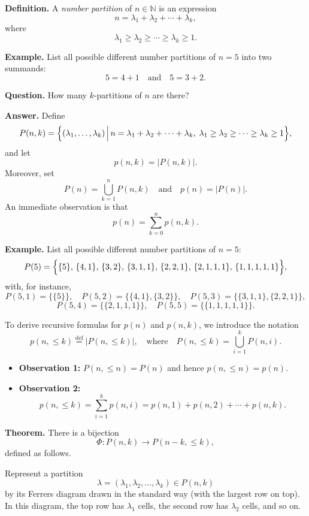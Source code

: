 \documentclass{article}
\begin{document}
\textbf{Definition.} A \emph{number partition} of \(n\in\mathbb{N}\) is an expression
\[
n = \lambda_1 + \lambda_2 + \cdots + \lambda_k,
\]
where
\[
\lambda_1 \ge \lambda_2 \ge \cdots \ge \lambda_k \ge 1.
\]

\medskip

\textbf{Example.} List all possible different number partitions of \(n=5\) into two summands:
\[
5 = 4+1 \quad \text{and} \quad 5 = 3+2.
\]

\medskip

\textbf{Question.} How many \(k\)-partitions of \(n\) are there?

\medskip

\textbf{Answer.} Define
\[
P(n,k)=\Bigl\{ (\lambda_1,\dots,\lambda_k)\,\Big|\, n=\lambda_1+\lambda_2+\cdots+\lambda_k,\; \lambda_1\ge\lambda_2\ge\cdots\ge\lambda_k\ge1 \Bigr\},
\]
and let
\[
p(n,k)=|P(n,k)|.
\]
Moreover, set
\[
P(n)=\bigcup_{k=1}^{n} P(n,k) \quad\text{and}\quad p(n)=|P(n)|.
\]
An immediate observation is that
\[
p(n)=\sum_{k=0}^{n} p(n,k).
\]

\medskip

\textbf{Example.} List all possible different number partitions of \(n=5\):
\[
P(5)=\Bigl\{\{5\},\, \{4,1\},\, \{3,2\},\, \{3,1,1\},\, \{2,2,1\},\, \{2,1,1,1\},\, \{1,1,1,1,1\}\Bigr\},
\]
with, for instance,
\[
P(5,1)=\{ \{5\}\},\quad P(5,2)=\{\{4,1\},\{3,2\}\},\quad P(5,3)=\{\{3,1,1\},\{2,2,1\}\},
\]
\[
P(5,4)=\{\{2,1,1,1\}\},\quad P(5,5)=\{\{1,1,1,1,1\}\}.
\]

\medskip

To derive recursive formulas for \(p(n)\) and \(p(n,k)\), we introduce the notation
\[
p(n,\le k)\stackrel{\text{def}}{=} |P(n,\le k)|,\quad\text{where}\quad P(n,\le k)=\bigcup_{i=1}^{k} P(n,i).
\]
\begin{itemize}
  \item \textbf{Observation 1:} \(P(n,\le n)=P(n)\) and hence \(p(n,\le n)=p(n)\).
  \item \textbf{Observation 2:} 
  \[
  p(n,\le k)=\sum_{i=1}^{k} p(n,i)=p(n,1)+p(n,2)+\cdots+p(n,k).
  \]
\end{itemize}

\bigskip

\textbf{Theorem.} There is a bijection
\[
\Phi\colon P(n,k) \longrightarrow P(n-k,\le k),
\]
defined as follows.

\medskip

Represent a partition
\[
\lambda=(\lambda_1,\lambda_2,\dots,\lambda_k)\in P(n,k)
\]
by its Ferrers diagram drawn in the standard way (with the largest row on top). In this diagram, the top row has \(\lambda_1\) cells, the second row has \(\lambda_2\) cells, and so on.
\end{document}
